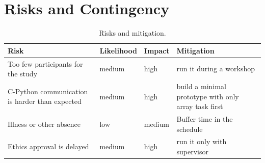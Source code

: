 \documentclass[11pt,a4paper]{article}
\begin{document}
\section{Risks and Contingency}\label{sec:risks}

\begin{table}[H]
	\centering
	\caption{Risks and mitigation.}
	\label{tab:risks}
	\begin{tabularx}{\linewidth}{>{\raggedright\arraybackslash}X l l >{\raggedright\arraybackslash}X}
		\toprule
		Risk & Likelihood & Impact & Mitigation \\
		\midrule
		Too few participants for the study & medium & high & run it during a workshop \\
		C-Python communication is harder than expected & medium & high & build a minimal prototype with only array task first \\
		Illness or other absence & low & medium & Buffer time in the schedule \\
        Ethics approval is delayed & medium & high & run it only with supervisor \\
		\bottomrule
	\end{tabularx}
\end{table}

\printbibliography[heading=bibintoc]
\end{document}
